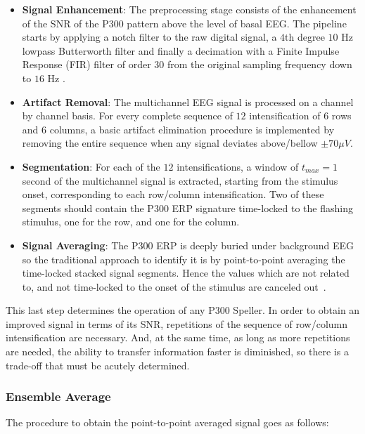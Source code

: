 \documentclass[utf8]{frontiersSCNS} %
\begin{document}
\begin{itemize}
\item \textbf{Signal Enhancement}: The preprocessing stage consists of the enhancement of the SNR of the P300 pattern above the level of basal EEG. The pipeline starts by applying a notch filter to the raw digital signal, a 
$4$th degree $10$ Hz lowpass Butterworth filter and finally a decimation with a Finite Impulse Response (FIR) filter of order $30$ from the original sampling frequency down to $16$ Hz \citep{Krusienski2006}.
\item \textbf{Artifact Removal}: The multichannel EEG signal is processed on a channel by channel basis.   For every complete sequence of $12$ intensification of $6$ rows and $6$ columns, a basic artifact elimination procedure is implemented by removing the entire sequence when any signal deviates above/bellow $ \pm 70 \mu V $.
\item \textbf{Segmentation}: For each of the $12$ intensifications,  a window of $t_{max} = 1$ second of the multichannel signal is extracted, starting from the stimulus onset, corresponding to each row/column intensification.  Two of these segments should contain the P300 ERP signature time-locked to the flashing stimulus, one for the row, and one for the column.
\item \textbf{Signal Averaging}:  The P300 ERP is deeply buried under background EEG so the traditional approach to identify it is by point-to-point averaging the time-locked stacked signal segments.  Hence the values which are not related to, and not time-locked to the onset of the stimulus are canceled out~\citep{Liang2008}. 
\end{itemize}

This last step determines the operation of any P300 Speller.  In order to obtain an improved signal in terms of its SNR, repetitions of the sequence of row/column intensification are necessary.  And, at the same time, as long as more repetitions are needed, the ability to transfer information faster is diminished, so there is a trade-off that must be acutely determined.

\subsubsection{Ensemble Average} \label{Average}

The procedure to obtain the point-to-point averaged signal goes as follows:
\end{document}
